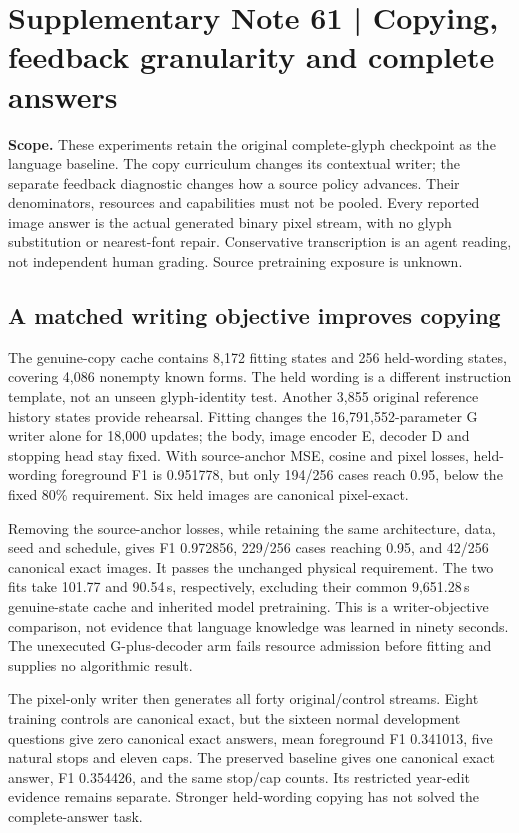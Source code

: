 \documentclass[10pt,a4paper]{article}
\providecommand{\DIFadd}[1]{{\protect\color{blue} \sf #1}} %
\begin{document}
\clearpage
\section*{\DIFadd{Supplementary Note 61 | Copying, feedback granularity and complete answers}}

\DIFadd{\textbf{Scope.}
These experiments retain the original complete-glyph checkpoint as the
language baseline. The copy curriculum changes its contextual writer; the
separate feedback diagnostic changes how a source policy advances. Their
denominators, resources and capabilities must not be pooled. Every reported
image answer is the actual generated binary pixel stream, with no glyph
substitution or nearest-font repair. Conservative transcription is an agent
reading, not independent human grading. Source pretraining exposure is unknown.
}

\subsection*{\DIFadd{A matched writing objective improves copying}}
\DIFadd{The genuine-copy cache contains 8,172 fitting states and 256 held-wording states,
covering 4,086 nonempty known forms. The held wording is a different instruction
template, not an unseen glyph-identity test. Another 3,855 original reference
history states provide rehearsal. Fitting changes the 16,791,552-parameter G
writer alone for 18,000 updates; the body, image encoder E, decoder D and
stopping head stay fixed. With source-anchor MSE, cosine and pixel losses,
held-wording foreground F1 is 0.951778, but only 194/256 cases reach 0.95,
below the fixed 80\% requirement. Six held images are canonical pixel-exact.
}

\DIFadd{Removing the source-anchor losses, while retaining the same architecture,
data, seed and schedule, gives F1 0.972856, 229/256 cases reaching 0.95, and
42/256 canonical exact images. It passes the unchanged physical requirement.
The two fits take 101.77 and 90.54\,s, respectively, excluding their common
9,651.28\,s genuine-state cache and inherited model pretraining. This is a
writer-objective comparison, not evidence that language knowledge was learned
in ninety seconds. The unexecuted G-plus-decoder arm fails resource admission
before fitting and supplies no algorithmic result.
}

\DIFadd{The pixel-only writer then generates all forty original/control streams.
Eight training controls are canonical exact, but the sixteen normal development
questions give zero canonical exact answers, mean foreground F1 0.341013,
five natural stops and eleven caps. The preserved baseline gives one canonical
exact answer, F1 0.354426, and the same stop/cap counts. Its restricted year-edit
evidence remains separate. Stronger held-wording copying has not solved the
complete-answer task.
}
\end{document}
